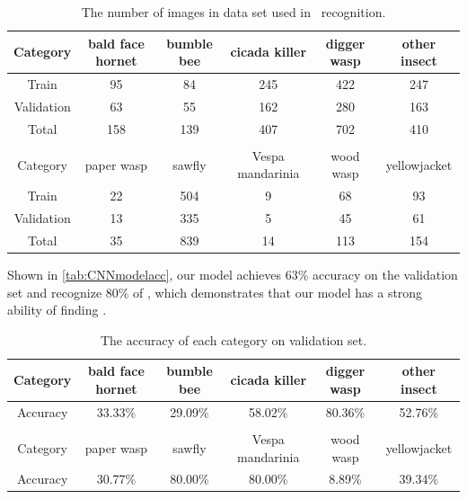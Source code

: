 \documentclass{mcmthesis}
\begin{document}
\begin{table}[H]
    \centering
    \begin{tabular}{cccccc}
        \toprule
        Category   &bald face hornet  &bumble bee  &cicada killer  &digger wasp  &other insect \\ 
        \midrule
        Train      & 95               & 84         & 245           & 422         & 247         \\ 
        Validation & 63               & 55         & 162           & 280         & 163         \\ 
        Total      & 158              & 139        & 407           & 702         & 410         \\ 
        \bottomrule
        \vspace{0pt} \\
        \toprule
        Category   &paper wasp       &sawfly    &Vespa mandarinia  &wood wasp    &yellowjacket  \\ 
        \midrule
        Train      & 22              & 504      & 9                & 68          & 93           \\ 
        Validation & 13              & 335      & 5                & 45          & 61           \\ 
        Total      & 35              & 839      & 14               & 113         & 154          \\
        \bottomrule
    \end{tabular}
    \caption{The number of images in data set used in \VM\ recognition.}
    \label{tab:dataset_proportion}
\end{table}

Shown in \autoref{tab:CNNmodelacc}, our model achieves 63\% accuracy on the validation set and recognize 80\% of \VM, which demonstrates that our model has a strong ability of finding \VM. 
\begin{table}[H]
    \centering
    \begin{tabular}{cccccc} 
        \toprule
        Category &bald face hornet  &bumble bee  &cicada killer  &digger wasp  &other insect  \\ 
        \midrule
        Accuracy & 33.33\%          & 29.09\%    & 58.02\%       & 80.36\%     & 52.76\%      \\ 
        \bottomrule
        \vspace{0pt} \\
        \toprule
        Category &paper wasp        &sawfly    &Vespa mandarinia  &wood wasp   &yellowjacket  \\ 
        \midrule
        Accuracy & 30.77\%          & 80.00\%  & 80.00\%          & 8.89\%     & 39.34\%      \\
        \bottomrule
    \end{tabular}
    \caption{The accuracy of each category on validation set.}
    \label{tab:CNNmodelacc}
\end{table}
\end{document}
